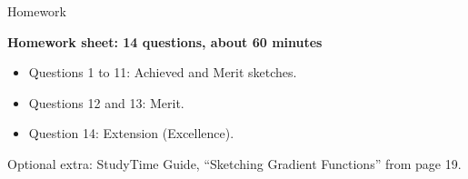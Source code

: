\documentclass[aspectratio=169,11pt,t,xcolor=table]{beamer}
\begin{document}
\begin{frame}{Homework}\relax
{\sEmph\bfseries Homework sheet: 14 questions, about 60 minutes\par}
\vskip4mm
\begin{itemize}
\item Questions 1 to 11: Achieved and Merit sketches.
\item Questions 12 and 13: Merit.
\item Question 14: Extension (Excellence).
\end{itemize}
\vskip4mm
Optional extra: StudyTime Guide, ``Sketching Gradient Functions'' from page 19.
\end{frame}
\end{document}
